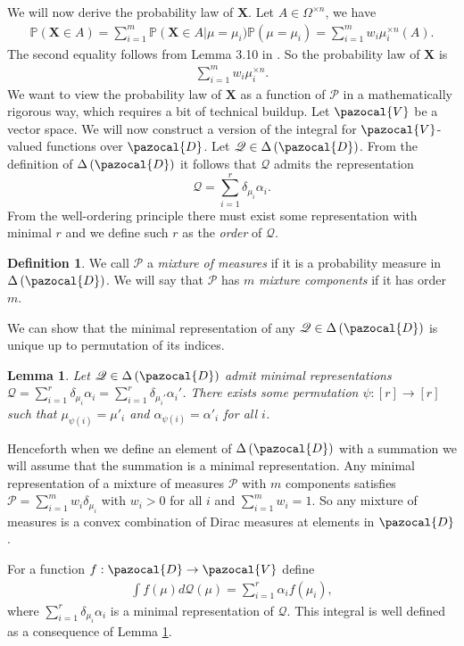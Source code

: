 \documentclass{article} %
\def\sD{\pazocal{D}}
\def\sV{\pazocal{V}}
\def\sP{\mathscr{P}}
\def\sQ{\mathscr{Q}}
\def\bX{\mathbf{X}}
\def\pr{\mathbb{P}}
\def\dd{\Delta\left( \sD \right)}
\newtheorem{lem}{Lemma}
\theoremstyle{definition}
\newtheorem{defin}{Definition}
\begin{document}
We will now derive the probability law of $\bX$. Let $A\in \Omega^{\times n}$, we have
\begin{eqnarray*}
	\pr\left(\bX \in A \right)
	= \sum_{i=1}^m \pr\left( \bX \in A \right|\mu=\mu_i) \pr\left( \mu=\mu_i \right)
	=  \sum_{i=1}^m w_i \mu_i^{\times n}\left( A \right).
\end{eqnarray*}
The second equality follows from Lemma 3.10 in \cite{fomp}.
So the probability law of $\bX$ is 
\begin{eqnarray}
	\label{xdens}
	\sum_{i=1}^m w_i \mu_i^{\times n}. 
\end{eqnarray}
We want to view the probability law of $\bX$ as a function of $\sP$ in a mathematically rigorous way, which requires a bit of technical buildup.
Let $\sV$ be a vector space. We will now construct a version of the integral for $\sV$-valued functions over $\sD$. Let $\sQ\in \dd$. From the definition of $\dd$ it follows that $\sQ$ admits the representation $$\sQ = \sum_{i=1}^r \delta_{\mu_i} \alpha_i.$$
From the well-ordering principle there must exist some representation with minimal $r$ and we define such $r$ as the {\it order} of $\sQ$. 
\begin{defin} \label{def:mixmeasure}
	We call $\sP$ a {\em mixture of measures} if it is a probability measure in $\dd$. We will say that $\sP$ has $m$ {\em mixture components} if it has order $m$.
\end{defin}
We can show that the minimal representation of any $\sQ \in \dd$ is unique up to permutation of its indices.
\begin{lem} \label{lem:represent}
	Let $\sQ\in \dd$ admit minimal representations $\sQ = \sum_{i=1}^r \delta_{\mu_i} \alpha_i = \sum_{i=1}^r\delta_{\mu_i'} \alpha_i'$. There exists some permutation $\psi:\left[ r \right] \to \left[ r \right]$ such that $\mu_{\psi\left( i \right)} = \mu'_i$ and $\alpha_{\psi\left( i \right)} = \alpha'_i$ for all $i$.
\end{lem}
Henceforth when we define an element of $\dd$ with a summation we will assume that the summation is a minimal representation. Any minimal representation of a mixture of measures $\sP$ with $m$ components satisfies $\sP=\sum_{i=1}^m w_i \delta_{\mu_i}$ with $w_i>0$ for all $i$ and $\sum_{i=1}^m w_i = 1$. So any mixture of measures is a convex combination of Dirac measures at elements in $\sD$.

 For a function $f:\sD \to \sV$ define
\begin{eqnarray*}
	\int f(\mu) d\sQ(\mu) = \sum_{i=1}^r \alpha_i f\left( \mu_i \right),
\end{eqnarray*}
where $\sum_{i=1}^r \delta_{\mu_i} \alpha_i$ is a minimal representation of $\sQ$. This integral is well defined as a consequence of Lemma \ref{lem:represent}.
\end{document}
